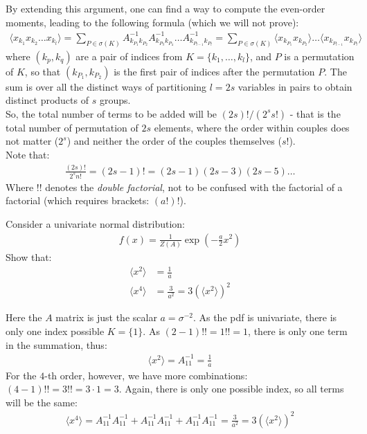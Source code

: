 \documentclass[../template.tex]{subfiles}
\begin{document}
By extending this argument, one can find a way to compute the even-order moments, leading to the following formula (which we will not prove):
\begin{align*}
    \langle x_{k_1} x_{k_2 } \dots x_{k_l}  \rangle = \sum_{P \in \sigma(K)} A^{-1}_{k_{P_1} k_{P_2}} A^{-1}_{k_{P_3}k_{P_4}}\dots A^{-1}_{k_{P_{l-1}} k_{P_l}} = \sum_{P \in \sigma(K)} \langle x_{k_{P_1 }} x_{k_{P_2}} \rangle \dots \langle x_{k_{P_{l-1}}} x_{k_{P_l}} \rangle
\end{align*}
where $(k_p, k_q)$ are a pair of indices from $K = \{k_1, \dots, k_l\}$, and $P$ is a permutation of $K$, so that $(k_{P_1}, k_{P_2})$ is the first pair of indices after the permutation $P$. The sum is over all the distinct ways of partitioning $l=2s$ variables in pairs to obtain distinct products of $s$ groups.\\
So, the total number of terms to be added will be $(2s)!/(2^s s!)$ - that is the total number of permutation of $2s$ elements, where the order within couples does not matter ($2^s$) and neither the order of the couples themselves ($s!$).\\
Note that:
\begin{align*}
    \frac{(2s)!}{2^s n!} = (2s-1)! = (2s-1)(2s-3)(2s-5)\dots 
\end{align*}
Where $!!$ denotes the \textit{double factorial}, not to be confused with the factorial of a factorial (which requires brackets: $(a!)!$).  

\begin{exo}
Consider a univariate normal distribution:
\begin{align*}
    f(x) = \frac{1}{Z(A)} \exp\left(-\frac{a}{2} x^2 \right) 
\end{align*}
Show that:
\begin{align*}
    \langle x^2 \rangle &= \frac{1}{a} \\
    \langle x^4 \rangle &= \frac{3}{a^2} = 3(\langle x^2 \rangle)^2
\end{align*}

Here the $A$ matrix is just the scalar $a = \sigma^{-2}$. As the pdf is univariate, there is only one index possible $K = \{1\}$. As $(2-1)!! = 1!! = 1$, there is only one term in the summation, thus: 
\begin{align*}
    \langle x^2 \rangle = A^{-1}_{11} =\frac{1}{a} 
\end{align*}   
For the $4$-th order, however, we have more combinations: $(4-1)!! = 3!! = 3 \cdot 1 = 3$. Again, there is only one possible index, so all terms will be the same:
\begin{align*}
    \langle x^4 \rangle = A^{-1}_{11}A^{-1}_{11} + A_{11}^{-1} A_{11}^{-1} + A_{11}^{-1} A_{11}^{-1} = \frac{3}{a^2} = 3 (\langle x^2 \rangle)^2 
\end{align*}
\end{exo}
\end{document}
